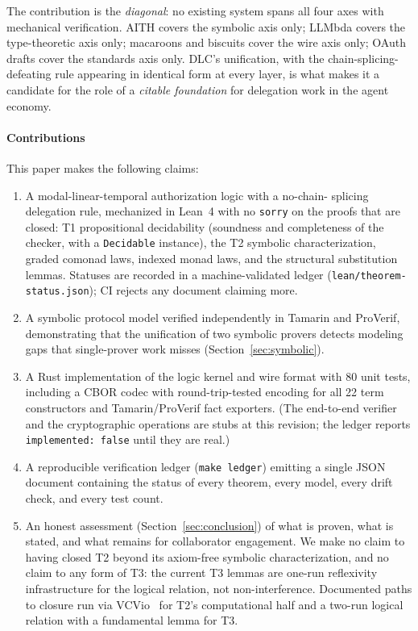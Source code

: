 The contribution is the \emph{diagonal}: no existing system spans all
four axes with mechanical verification.  AITH covers the symbolic
axis only; LLMbda covers the type-theoretic axis only; macaroons
and biscuits cover the wire axis only; OAuth drafts cover the
standards axis only.  DLC's unification, with the chain-splicing-
defeating rule appearing in identical form at every layer, is what
makes it a candidate for the role of a \emph{citable foundation}
for delegation work in the agent economy.

\paragraph{Contributions}

This paper makes the following claims:

\begin{enumerate}
\item A modal-linear-temporal authorization logic with a no-chain-
  splicing delegation rule, mechanized in Lean~4 with no
  \texttt{sorry} on the proofs that are closed: T1 propositional
  decidability (soundness and completeness of the checker, with a
  \texttt{Decidable} instance), the T2 symbolic characterization,
  graded comonad laws, indexed monad laws, and the structural
  substitution lemmas. Statuses are recorded in a machine-validated
  ledger (\texttt{lean/theorem-status.json}); CI rejects any document
  claiming more.
\item A symbolic protocol model verified independently in Tamarin
  and ProVerif, demonstrating that the unification of two
  symbolic provers detects modeling gaps that single-prover work
  misses (Section~\ref{sec:symbolic}).
\item A Rust implementation of the logic kernel and wire format with
  80 unit tests, including a CBOR codec with round-trip-tested
  encoding for all 22 term constructors and Tamarin/ProVerif fact
  exporters.  (The end-to-end verifier and the cryptographic
  operations are stubs at this revision; the ledger reports
  \texttt{implemented: false} until they are real.)
\item A reproducible verification ledger (\texttt{make ledger})
  emitting a single JSON document containing the status of every
  theorem, every model, every drift check, and every test count.
\item An honest assessment (Section~\ref{sec:conclusion}) of what is
  proven, what is stated, and what remains for collaborator
  engagement.  We make no claim to having closed T2 beyond its
  axiom-free symbolic characterization, and no claim to any form of
  T3: the current T3 lemmas are one-run reflexivity infrastructure
  for the logical relation, not non-interference.  Documented paths
  to closure run via VCVio~\cite{tuma2026vcvio} for T2's
  computational half and a two-run logical relation with a
  fundamental lemma for T3.
\end{enumerate}

